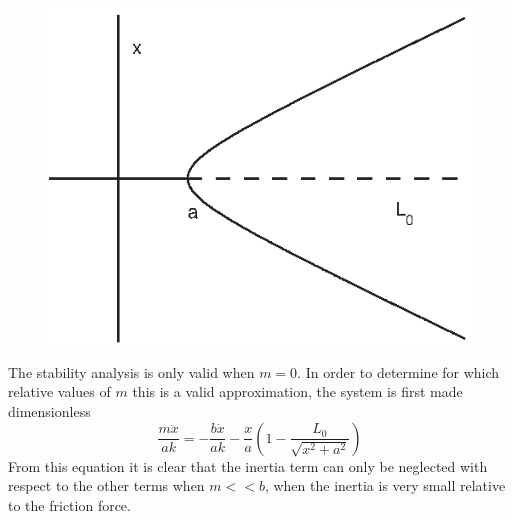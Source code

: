 \begin{figure}[htp]
\centering
\includegraphics{img/ex1/bif1.eps}
\caption{}
\label{fig:ex1bif1}
\end{figure}

The stability analysis is only valid when $m=0$. In order to determine for which relative values of $m$ this is a valid approximation, the system is first made dimensionless
\begin{equation}
\frac{m\ddot{x}}{ak}= -\frac{b\dot{x}}{ak}-\frac{x}{a}\left(1-\frac{L_0}{\sqrt{x^2+a^2}}\right)
\end{equation}
From this equation it is clear that the inertia term can only be neglected with respect to the other terms when $m<<b$, when the inertia is very small relative to the friction force.
